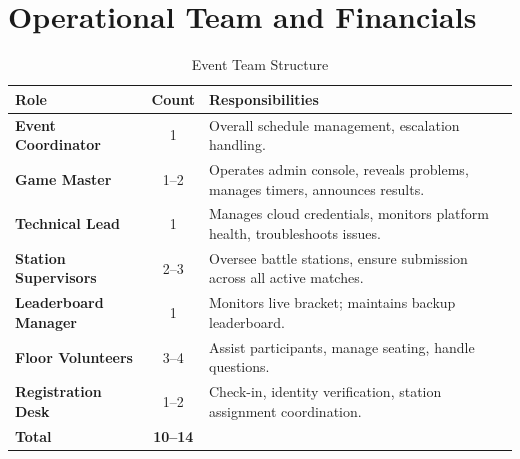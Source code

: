 \documentclass[11pt, a4paper]{article}
\begin{document}
\section{Operational Team and Financials}
\label{sec:team}

\begin{table}[H]
\centering
\renewcommand{\arraystretch}{1.3}
\begin{tabularx}{\textwidth}{>{\bfseries}l c X}
\toprule
Role & Count & Responsibilities \\
\midrule
Event Coordinator    & 1   & Overall schedule management, escalation handling. \\
Game Master          & 1--2 & Operates admin console, reveals problems, manages timers, announces results. \\
Technical Lead       & 1   & Manages cloud credentials, monitors platform health, troubleshoots issues. \\
Station Supervisors  & 2--3 & Oversee battle stations, ensure submission across all active matches. \\
Leaderboard Manager  & 1   & Monitors live bracket; maintains backup leaderboard. \\
Floor Volunteers     & 3--4 & Assist participants, manage seating, handle questions. \\
Registration Desk    & 1--2 & Check-in, identity verification, station assignment coordination. \\
\midrule
\textbf{Total} & \textbf{10--14} & \\
\bottomrule
\end{tabularx}
\caption{Event Team Structure}
\end{table}
\end{document}

